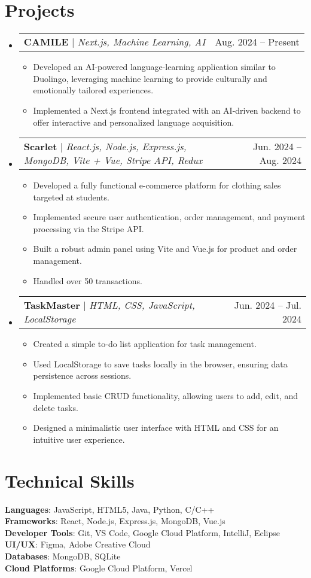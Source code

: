 \documentclass[letterpaper,11pt]{article}
\makeatletter
\newcommand{\resumeItem}[1]{
  \item\small{
    {#1 \vspace{-2pt}}
  }
}
\newcommand{\resumeProjectHeading}[2]{
    \item
    \begin{tabular*}{0.97\textwidth}{l@{\extracolsep{\fill}}r}
      \small#1 & #2 \\
    \end{tabular*}\vspace{-7pt}
}
\newcommand{\resumeSubHeadingListStart}{\begin{itemize}[leftmargin=0.15in, label={}]}
\newcommand{\resumeSubHeadingListEnd}{\end{itemize}}
\newcommand{\resumeItemListStart}{\begin{itemize}}
\newcommand{\resumeItemListEnd}{\end{itemize}\vspace{-5pt}}
\makeatother
\begin{document}
\section{Projects}
        \resumeSubHeadingListStart
        \resumeProjectHeading
        {\textbf{CAMILE} $|$ \emph{Next.js, Machine Learning, AI}}{Aug. 2024 -- Present}
        \resumeItemListStart
          \resumeItem{Developed an AI-powered language-learning application similar to Duolingo, leveraging machine learning to provide culturally and emotionally tailored experiences.}
          \resumeItem{Implemented a Next.js frontend integrated with an AI-driven backend to offer interactive and personalized language acquisition.}
        \resumeItemListEnd
      \resumeProjectHeading
          {\textbf{Scarlet} $|$ \emph{React.js, Node.js, Express.js, MongoDB, Vite + Vue, Stripe API, Redux}}{Jun. 2024 -- Aug. 2024}
          \resumeItemListStart
            \resumeItem{Developed a fully functional e-commerce platform for clothing sales targeted at students.}
            \resumeItem{Implemented secure user authentication, order management, and payment processing via the Stripe API.}
            \resumeItem{Built a robust admin panel using Vite and Vue.js for product and order management.}
            \resumeItem{Handled over 50 transactions.}
          \resumeItemListEnd
          \resumeProjectHeading
          {\textbf{TaskMaster} $|$ \emph{HTML, CSS, JavaScript, LocalStorage}}{Jun. 2024 -- Jul. 2024}
          \resumeItemListStart
            \resumeItem{Created a simple to-do list application for task management.}
            \resumeItem{Used LocalStorage to save tasks locally in the browser, ensuring data persistence across sessions.}
            \resumeItem{Implemented basic CRUD functionality, allowing users to add, edit, and delete tasks.}
            \resumeItem{Designed a minimalistic user interface with HTML and CSS for an intuitive user experience.}
          \resumeItemListEnd
    \resumeSubHeadingListEnd


\section{Technical Skills}
 \begin{itemize}[leftmargin=0.15in, label={}]
    \small{\item{
     \textbf{Languages}{: JavaScript, HTML5, Java, Python, C/C++} \\
     \textbf{Frameworks}{: React, Node.js, Express.js, MongoDB, Vue.js} \\
     \textbf{Developer Tools}{: Git, VS Code, Google Cloud Platform, IntelliJ, Eclipse} \\
     \textbf{UI/UX}{: Figma, Adobe Creative Cloud} \\
     \textbf{Databases}{: MongoDB, SQLite} \\
     \textbf{Cloud Platforms}{: Google Cloud Platform, Vercel} \\
    }}
 \end{itemize}

\end{document}
